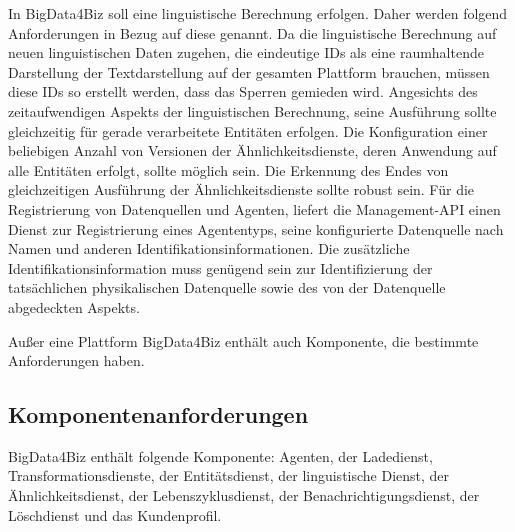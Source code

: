 In BigData4Biz soll eine linguistische Berechnung erfolgen. Daher werden folgend Anforderungen in Bezug auf diese genannt. Da die linguistische Berechnung auf neuen linguistischen Daten zugehen, die eindeutige IDs als eine raumhaltende Darstellung der Textdarstellung auf der gesamten Plattform brauchen, müssen diese IDs so erstellt werden, dass das Sperren gemieden wird. Angesichts des zeitaufwendigen Aspekts der linguistischen Berechnung, seine Ausführung sollte gleichzeitig für gerade verarbeitete Entitäten erfolgen. Die Konfiguration einer beliebigen Anzahl von Versionen der Ähnlichkeitsdienste, deren Anwendung auf alle Entitäten erfolgt, sollte möglich sein. Die Erkennung des Endes von gleichzeitigen Ausführung der Ähnlichkeitsdienste sollte robust sein. Für die Registrierung von Datenquellen und Agenten, liefert die Management-API einen Dienst zur Registrierung eines Agententyps, seine konfigurierte Datenquelle nach Namen und anderen Identifikationsinformationen. Die zusätzliche Identifikationsinformation muss genügend sein zur Identifizierung der tatsächlichen physikalischen Datenquelle sowie des von der Datenquelle abgedeckten Aspekts. 

Außer eine Plattform BigData4Biz enthält auch Komponente, die bestimmte Anforderungen haben.


\subsection{Komponentenanforderungen}
\label{subsec:Komponentenanforderungen}

BigData4Biz enthält folgende Komponente: Agenten, der Ladedienst, Transformationsdienste, der Entitätsdienst, der linguistische Dienst, der Ähnlichkeitsdienst, der Lebenszyklusdienst, der Benachrichtigungsdienst, der Löschdienst und das Kundenprofil.

